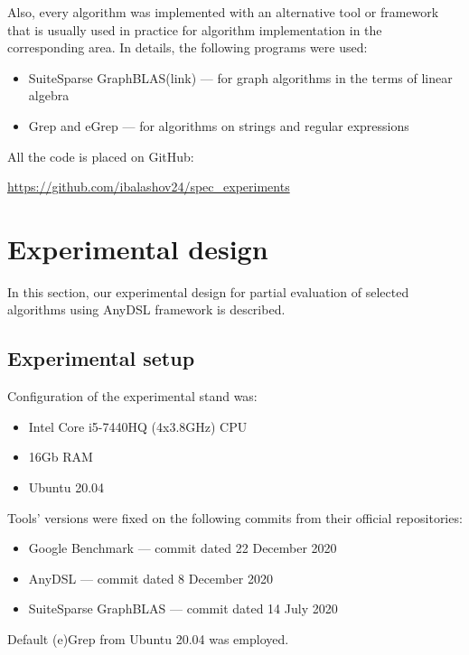 \documentclass[conference]{IEEEtran}
\begin{document}
Also, every algorithm was implemented with an alternative tool or framework that is usually used in practice for algorithm implementation in the corresponding area. In details, the following programs were used:
\begin{itemize}
	\item SuiteSparse GraphBLAS(link) --- for graph algorithms in the terms of linear algebra
	\item Grep and eGrep --- for algorithms on strings and regular expressions
\end{itemize}


All the code is placed on GitHub:
\begin{center}
\href{https://github.com/ibalashov24/spec\_experiments}{https://github.com/ibalashov24/spec\_experiments}
\end{center}

\section{Experimental design}

In this section, our experimental design for partial evaluation of selected algorithms using AnyDSL framework is described.

\subsection{Experimental setup}

Configuration of the experimental stand was:
\begin{itemize}
	\item Intel Core i5-7440HQ (4x3.8GHz) CPU
	\item 16Gb RAM
	\item Ubuntu 20.04
\end{itemize}

Tools' versions were fixed on the following commits from their official repositories:
\begin{itemize}
	\item Google Benchmark \cite{gbenchmark} --- commit dated 22 December 2020
	\item AnyDSL \cite{leissa2018anydsl} --- commit dated 8 December 2020
	\item SuiteSparse GraphBLAS \cite{moreira2018implementing} --- commit dated 14 July 2020
\end{itemize}

Default (e)Grep from Ubuntu 20.04 was employed.
\end{document}
